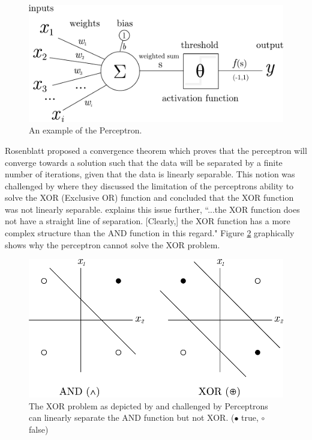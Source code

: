 \documentclass[report, 11pt, oneside]{dissertation}
\begin{document}
\begin{figure}[!htb]
	\centering
	\includegraphics[scale=0.5]{figure_2}
	\caption{An example of the Perceptron.}
	\label{fig:perceptron}
\end{figure}

Rosenblatt proposed a convergence theorem which proves that the perceptron will converge towards a solution such that the data will be separated by a finite number of iterations, given that the data is linearly separable. This notion was challenged by \citep{minsky69perceptrons} where they discussed the limitation of the perceptrons ability to solve the XOR (Exclusive OR) function and concluded that the XOR function was not linearly separable. \citep[170]{Ertel:2011:IAI:1971988} explains this issue further, ``...the XOR function does not have a straight line of separation. [Clearly,] the XOR function has a more complex structure than the AND function in this regard." Figure \ref{fig:xor_problem} graphically shows why the perceptron cannot solve the XOR problem.

\begin{figure}[!htb]
	\centering
	\includegraphics[scale=0.75]{figure_3}
	\caption[The XOR problem.]{The XOR problem as depicted by \citep[170]{Ertel:2011:IAI:1971988} and challenged by \citep{minsky69perceptrons} Perceptrons can linearly separate the AND function but not XOR. ($ \bullet $ true, $\circ $ false) }
	\label{fig:xor_problem}
\end{figure}
\end{document}
